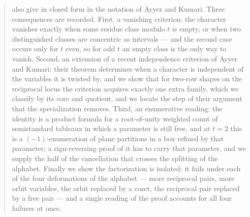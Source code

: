 \documentclass[11pt,reqno]{amsart}
\theoremstyle{plain}
\theoremstyle{definition}
\begin{document}
\begin{abstract}
also give in closed form in the notation of Ayyer and Kumari. Three
consequences are recorded. First, a vanishing criterion: the character vanishes exactly when some
residue class modulo $t$ is empty, or when two distinguished classes are concentric as intervals ---
and the second case occurs only for $t$ even, so for odd $t$ an empty class is the only way to
vanish. Second, an extension of a recent independence criterion of Ayyer and Kumari: their theorem
determines when a character is independent of the variables it is twisted by, and we show that for
two-row shapes on the reciprocal locus the criterion acquires exactly one extra family, which we classify by its core
and quotient, and we locate the step of their argument that the specialization removes. Third, an
enumerative reading: the
identity is a product formula for a root-of-unity weighted count of semistandard tableaux in which a
parameter is still free, and at $t=2$ this is a $(-1)$-enumeration of plane partitions in a box
refined by that parameter; a sign-reversing proof of it has to carry that parameter, and we supply
the half of the cancellation that crosses the splitting of the alphabet. Finally we show the
factorization is isolated: it fails under each of the
four deformations of the alphabet --- more reciprocal pairs, more orbit variables, the orbit replaced
by a coset, the reciprocal pair replaced by a free pair --- and a single reading of the proof
accounts for all four failures at once.


\end{abstract}
\end{document}
